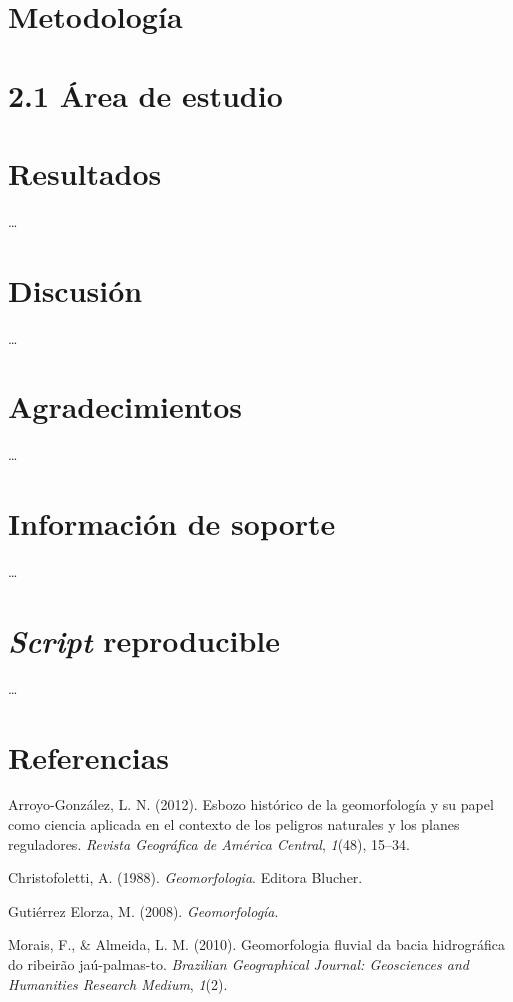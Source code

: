 \documentclass[11pt,]{article}
\begin{document}
\section{Metodología}\label{metodologuxeda}

\section{2.1 Área de estudio}\label{uxe1rea-de-estudio}

\section{Resultados}\label{resultados}

\ldots

\section{Discusión}\label{discusiuxf3n}

\ldots

\section{Agradecimientos}\label{agradecimientos}

\ldots

\section{Información de soporte}\label{informaciuxf3n-de-soporte}

\ldots

\section{\texorpdfstring{\emph{Script}
reproducible}{Script reproducible}}\label{script-reproducible}

\ldots

\section*{Referencias}\label{referencias}

\hypertarget{refs}{}
\hypertarget{ref-arroyo2012esbozo}{}
Arroyo-González, L. N. (2012). Esbozo histórico de la geomorfología y su
papel como ciencia aplicada en el contexto de los peligros naturales y
los planes reguladores. \emph{Revista Geográfica de América Central},
\emph{1}(48), 15--34.

\hypertarget{ref-christofoletti1988geomorfologia}{}
Christofoletti, A. (1988). \emph{Geomorfologia}. Editora Blucher.

\hypertarget{ref-gutierrez2008geomorfologia}{}
Gutiérrez Elorza, M. (2008). \emph{Geomorfología}.

\hypertarget{ref-morais2010geomorfologia}{}
Morais, F., \& Almeida, L. M. (2010). Geomorfologia fluvial da bacia
hidrográfica do ribeirão jaú-palmas-to. \emph{Brazilian Geographical
Journal: Geosciences and Humanities Research Medium}, \emph{1}(2).




\newpage
\singlespacing 
\end{document}
